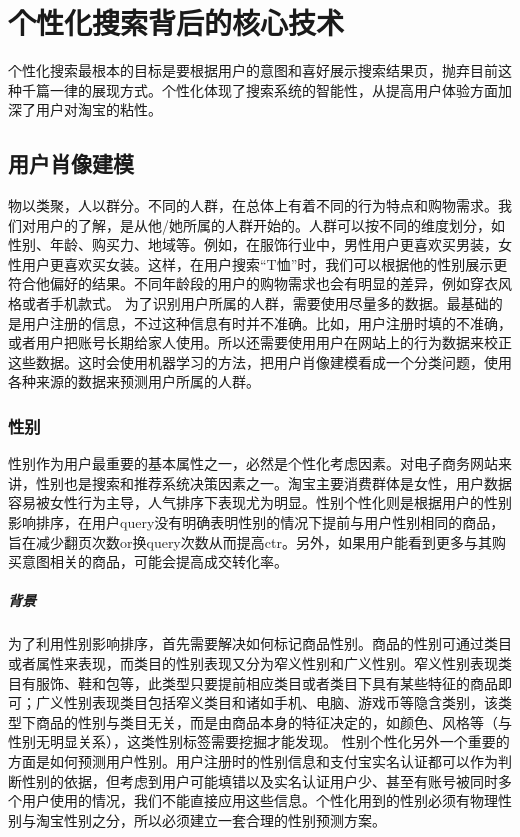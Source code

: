 
\chapter{个性化搜索背后的核心技术}
\thispagestyle{empty}

\setlength{\fboxrule}{0pt}\setlength{\fboxsep}{0cm}
\noindent\shadowbox{
\begin{tcolorbox}[arc=0mm,colback=lightblue,colframe=darkblue,title=学习目标与要求]

\end{tcolorbox}}
\setlength{\fboxrule}{1pt}\setlength{\fboxsep}{4pt} 

个性化搜索最根本的目标是要根据用户的意图和喜好展示搜索结果页，抛弃目前这种千篇一律的展现方式。个性化体现了搜索系统的智能性，从提高用户体验方面加深了用户对淘宝的粘性。

\section{用户肖像建模} 
	物以类聚，人以群分。不同的人群，在总体上有着不同的行为特点和购物需求。我们对用户的了解，是从他/她所属的人群开始的。人群可以按不同的维度划分，如性别、年龄、购买力、地域等。例如，在服饰行业中，男性用户更喜欢买男装，女性用户更喜欢买女装。这样，在用户搜索“T恤”时，我们可以根据他的性别展示更符合他偏好的结果。不同年龄段的用户的购物需求也会有明显的差异，例如穿衣风格或者手机款式。
	为了识别用户所属的人群，需要使用尽量多的数据。最基础的是用户注册的信息，不过这种信息有时并不准确。比如，用户注册时填的不准确，或者用户把账号长期给家人使用。所以还需要使用用户在网站上的行为数据来校正这些数据。这时会使用机器学习的方法，把用户肖像建模看成一个分类问题，使用各种来源的数据来预测用户所属的人群。
	\subsection{性别}
	性别作为用户最重要的基本属性之一，必然是个性化考虑因素。对电子商务网站来讲，性别也是搜索和推荐系统决策因素之一。淘宝主要消费群体是女性，用户数据容易被女性行为主导，人气排序下表现尤为明显。性别个性化则是根据用户的性别影响排序，在用户query没有明确表明性别的情况下提前与用户性别相同的商品，旨在减少翻页次数or换query次数从而提高ctr。另外，如果用户能看到更多与其购买意图相关的商品，可能会提高成交转化率。
	\paragraph{背景}
	为了利用性别影响排序，首先需要解决如何标记商品性别。商品的性别可通过类目或者属性来表现，而类目的性别表现又分为窄义性别和广义性别。窄义性别表现类目有服饰、鞋和包等，此类型只要提前相应类目或者类目下具有某些特征的商品即可；广义性别表现类目包括窄义类目和诸如手机、电脑、游戏币等隐含类别，该类型下商品的性别与类目无关，而是由商品本身的特征决定的，如颜色、风格等（与性别无明显关系），这类性别标签需要挖掘才能发现。
	性别个性化另外一个重要的方面是如何预测用户性别。用户注册时的性别信息和支付宝实名认证都可以作为判断性别的依据，但考虑到用户可能填错以及实名认证用户少、甚至有账号被同时多个用户使用的情况，我们不能直接应用这些信息。个性化用到的性别必须有物理性别与淘宝性别之分，所以必须建立一套合理的性别预测方案。
